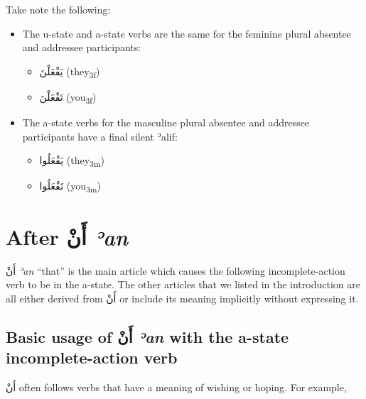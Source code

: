 \documentclass[
  10pt,
]{book}
\providecommand{\tightlist}{%
  \setlength{\itemsep}{0pt}\setlength{\parskip}{0pt}}
\begin{document}
Take note the following:

\begin{itemize}
\tightlist
\item
  The u-state and a-state verbs are the same for the feminine plural absentee and addressee participants:

  \begin{itemize}
  \tightlist
  \item
    \foreignlanguage{arabic}{يَفْعَلْنَ} (they\textsubscript{3f})
  \item
    \foreignlanguage{arabic}{تَفْعَلْنَ} (you\textsubscript{3f})
  \end{itemize}
\item
  The a-state verbs for the masculine plural absentee and addressee participants have a final silent ʾalif:

  \begin{itemize}
  \tightlist
  \item
    \foreignlanguage{arabic}{يَفْعَلُوا} (they\textsubscript{3m})
  \item
    \foreignlanguage{arabic}{تَفْعَلُوا} (you\textsubscript{3m})
  \end{itemize}
\end{itemize}

\section{\texorpdfstring{After \foreignlanguage{arabic}{أَنْ} \emph{ʾan}}{After أَنْ ʾan}}\label{after-ux623ux646-ean}

\foreignlanguage{arabic}{أَنْ} \emph{ʾan} \enquote{that} is the main article which causes the following
incomplete-action verb to be in the a-state.
The other articles that we listed in the introduction are all either derived from
\foreignlanguage{arabic}{أَنْ}
or include its meaning implicitly without expressing it.

\subsection{\texorpdfstring{Basic usage of \foreignlanguage{arabic}{أَنْ} \emph{ʾan} with the a-state incomplete-action verb}{Basic usage of أَنْ ʾan with the a-state incomplete-action verb}}\label{basic-usage-of-ux623ux646-ean-with-the-a-state-incomplete-action-verb}

\foreignlanguage{arabic}{أَنْ} often follows verbs that have a meaning of wishing or hoping. For example,
\end{document}
